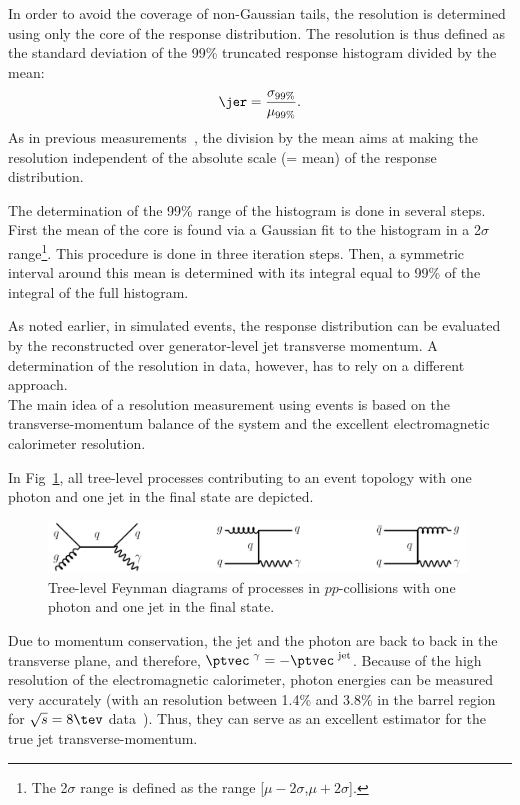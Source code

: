 In order to avoid the coverage of non-Gaussian tails, the resolution is determined using only the core of the response distribution.
The resolution is thus defined as the standard deviation of the 99\% truncated response histogram divided by the mean:
\begin{equation*}\label{res:eq:resolutionFormula}
\jer = \frac{\sigma_{99\%}}{\mu_{99\%}}.
\end{equation*}
As in previous measurements~\cite{bib:CMS-AN-2010-076}, the division by the mean aims at making the resolution independent of the absolute scale (= mean) of the response distribution.

The determination of the 99\% range of the histogram is done in several steps. 
First the mean of the core is found via a Gaussian fit to the histogram in a 2$\sigma$ range\footnote{The 2$\sigma$ range is defined as the range [$\mu - 2\sigma$,$\mu + 2\sigma$].}. 
This procedure is done in three iteration steps.
Then, a symmetric interval around this mean is determined with its integral equal to 99\% of the integral of the full histogram. 

As noted earlier, in simulated events, the response distribution can be evaluated by the reconstructed over generator-level jet transverse momentum.
A determination of the resolution in data, however, has to rely on a different approach.\\



The main idea of a resolution measurement using \GAMJET events is based on the transverse-momentum balance of the \GAMJET system and the excellent electromagnetic calorimeter resolution.

In Fig~\ref{res:fig:FeynmanDiagrams}, all tree-level processes contributing to an event topology with one photon and one jet in the final state are depicted. 
\begin{figure}[b]
  \centering
      \includegraphics[width=0.99\textwidth]{figures/resolution/generalApproach/FeynmanDiagram.pdf}
  \caption{Tree-level Feynman diagrams of processes in $pp$-collisions with one photon and one jet in the final state.}  
  \label{res:fig:FeynmanDiagrams}
\end{figure}
Due to momentum conservation, the jet and the photon are back to back in the transverse plane, and therefore, $\ptvec^{\,\,\gamma} = -\ptvec^{\,\,\text{jet}}$. 
Because of the high resolution of the electromagnetic calorimeter, photon energies can be measured very accurately (with an resolution between 1.4\% and 3.8\% in the barrel region for $\sqrt{s}=8\tev$ data~\cite{bib:CMS:PhotonIdentification_8TeV}).
Thus, they can serve as an excellent estimator for the true jet transverse-momentum.


